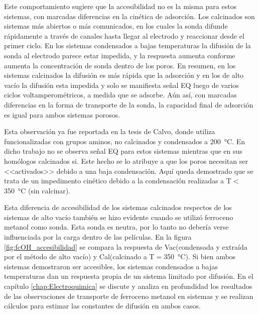       Este comportamiento sugiere que la accesibilidad no es la misma para estos sistemas, con marcadas diferencias en la cinética de adsorción. Los calcinados son sistemas más abiertos o más comunicados, en los cuales la sonda difunde rápidamente a través de canales hasta llegar al electrodo y reaccionar desde el primer ciclo. En los sistemas condensados a bajas temperaturas la difusión de la sonda al electrodo parece estar impedida, y la respuesta aumenta conforme aumenta la concentración de sonda dentro de los poros. En resumen, en los sistemas calcinados la difusión es más rápida que la adsorción y en los de alto vacío la difusión esta impedida y solo se manifiesta señal EQ luego de varios ciclos voltamperométricos, a medida que se adsorbe. Aún así, con marcadas diferencias en la forma de transporte de la sonda, la capacidad final de adsorción es igual para ambos sistemas porosos.

      Esta observación ya fue reportada en la tesis de Calvo\cite{Calvo20210}, donde utiliza \pdmF\space funcionalizadas con grupos aminos, no calcinados y condensados a \SI{200}{\celsius}. En dicho trabajo no se observa señal EQ para estos sistemas mientras que en sus homólogos calcinados si. Este hecho se lo atribuye a que los poros necesitan ser <<activados>> debido a una baja condensación. Aquí queda demostrado que se trata de un impedimento cinético debido a la condensación realizadas a T$<$\SI{350}{\celsius} (sin calcinar).

      Esta diferencia de accesibilidad de los sistemas calcinados respectos de los sistemas de alto vacío también se hizo evidente cuando se utilizó ferroceno metanol como sonda. Esta sonda es neutra, por lo tanto no debería verse influenciada por la carga dentro de las películas. En la figura \ref{fig:fcOH_accesibilidad} se compara la respuesta de Vac\pdmF\space (condensada y extraída por el método de alto vacío) y Cal\pdmF\space (calcinado a T$=$\SI{350}{\celsius}). Si bien ambos sistemas demostraron ser accesibles, los sistemas condensados a bajas temperaturas dan un respuesta propia de un sistema limitado por difusión. En el capítulo \ref{chap:Electroquimica} se discute y analiza en profundidad los resultados de las observaciones de transporte de ferroceno metanol en sistemas \pdmF y se realizan cálculos para estimar las constantes de difusión en ambos casos.

